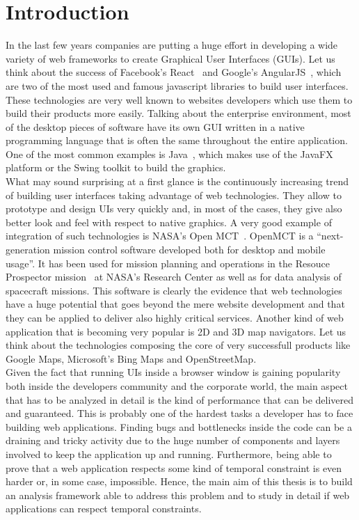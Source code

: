 ﻿%
\chapter{Introduction} \label{cha:intro}

In the last few years companies are putting a huge effort in developing a wide variety of 
web frameworks to create Graphical User Interfaces (GUIs). Let us think about the success of Facebook's
React~\cite{fbreact} and Google's AngularJS~\cite{angularjs}, which are two of the most
used and famous javascript libraries to build user interfaces.
These technologies are very well known to websites developers which use them to
build their products more easily.
Talking about the enterprise environment, most of the desktop pieces of software have its own GUI
written in a native programming language that is often the same throughout the entire application.
One of the most common examples is Java~\cite{gosling1995java}, which makes use of the JavaFX
platform or the Swing toolkit to build the graphics.\\
What may sound surprising at a first glance is the continuously increasing trend of 
building user interfaces taking advantage of web technologies.
They allow to prototype and design UIs very quickly and, in
most of the cases, they give also better look and feel with respect to native graphics.
A very good example of integration of such technologies is NASA's Open MCT~\cite{openmct}.
OpenMCT is a ``next-generation mission control software developed both for desktop and mobile
usage''. It has been used for mission planning and operations in the Resouce 
Prospector mission~\cite{andrews2014introducing} at NASA's Research Center as well as for
data analysis of spacecraft missions. This software is clearly the evidence that web
technologies have a huge potential that goes beyond the mere website development and that they 
can be applied to deliver also highly critical services.
Another kind of web application that is becoming very popular is 2D and 3D map navigators.
Let us think about the technologies composing the core of very successfull products like
Google Maps, Microsoft's Bing Maps and OpenStreetMap.\\
Given the fact that running UIs inside a browser window is gaining popularity both inside the
developers community and the corporate world, the main aspect that has to be analyzed
in detail is the kind of performance that can be delivered and guaranteed. This is probably one of
the hardest tasks a developer has to face building web applications. Finding bugs
and bottlenecks inside the code can be a draining and tricky activity due to the huge number
of components and layers involved to keep the application up and running. Furthermore,
being able to prove that a web application respects some kind of temporal constraint
is even harder or, in some case, impossible. Hence, the main aim of this thesis is
to build an analysis framework able to address this problem and to study in detail
if web applications can respect temporal constraints.

